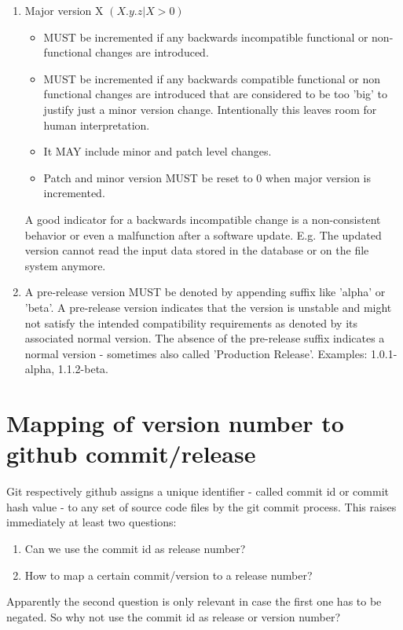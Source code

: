 \documentclass[10pt,a4paper]{article}
\begin{document}
\begin{enumerate}
\item Major version X $(X.y.z | X > 0)$  
\begin{itemize}
\item MUST be incremented if any backwards incompatible functional or non-functional changes are introduced.
\item MUST be incremented if any backwards compatible functional or non functional changes are introduced that are considered to be too 'big' to justify just a minor version change. Intentionally this leaves room for human interpretation.
\item It MAY include minor and patch level changes.
\item Patch and minor version MUST be reset to 0 when major version is incremented.
\end{itemize}

A good indicator for a backwards incompatible change is a non-consistent behavior or even a malfunction after a software update. E.g. The updated version cannot read the input data stored in the database or on the file system anymore.

\item A pre-release version MUST be denoted by appending suffix like 'alpha' or 'beta'. A pre-release version indicates that the version is unstable and might not satisfy the intended compatibility requirements as denoted by its associated normal version. The absence of the pre-release suffix indicates a normal version - sometimes also called 'Production Release'. Examples: 1.0.1-alpha, 1.1.2-beta.


\end{enumerate}

\section*{Mapping of version number to github commit/release}

Git respectively github assigns a unique identifier - called  commit id or commit hash value -  to any set of source code files by the git commit process. This raises immediately at least two questions:
\begin{enumerate}
\item Can we use the commit id as release number?
\item How to map a certain commit/version to a release number?
\end{enumerate}

Apparently the second question is only relevant in case the first one has to be negated. So why not use the commit id as release or version number?
\end{document}
